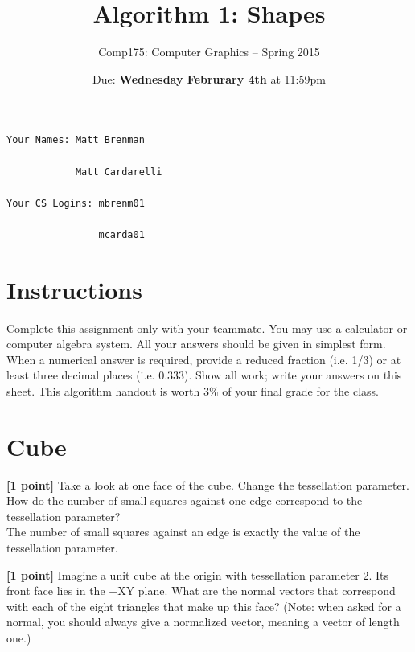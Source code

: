 \documentclass[10pt,twocolumn]{article}
\title{\Huge{\bf Algorithm 1: Shapes}}
\author{Comp175: Computer Graphics -- Spring 2015}
\date{Due:  {\bf Wednesday Februrary 4th} at 11:59pm}                                           %
\begin{document}
\maketitle

\begin{verbatim}
Your Names: Matt Brenman

            Matt Cardarelli

Your CS Logins: mbrenm01

                mcarda01\end{verbatim}

\section{Instructions}
Complete this assignment only with your teammate. You may use a
calculator or computer algebra system. All your answers should be given in simplest form.
When a numerical answer is required, provide a reduced fraction (i.e. 1/3) or at least three
decimal places (i.e. 0.333). Show all work; write your answers on this sheet. This algorithm handout is worth 3\% of your final grade for the class.


\section{Cube}
 {\bf [1 point]} Take a look at one face of the cube. Change the tessellation parameter. How do the number of small squares against one edge correspond to the tessellation parameter?
\vspace{2em}\\

The number of small squares against an edge is exactly the value of the tessellation parameter.

\vspace{2em}
{\bf [1 point]} Imagine a unit cube at the origin with tessellation parameter 2. Its front face lies in the +XY plane. What are the normal vectors that correspond with each of the eight triangles that make up this face? (Note: when asked for a normal, you should always give a normalized vector, meaning a vector of length one.)
\vspace{6em}
\end{document}
